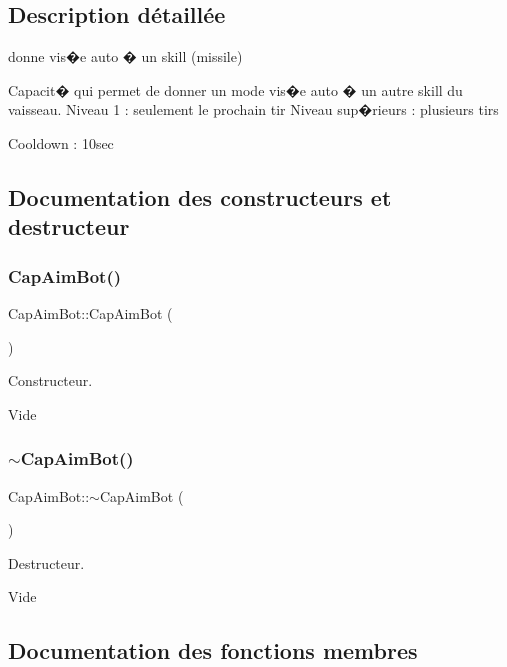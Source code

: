\subsection{Description détaillée}
donne vis�e auto � un skill (missile) 

Capacit� qui permet de donner un mode vis�e auto � un autre skill du vaisseau. Niveau 1 \+: seulement le prochain tir Niveau sup�rieurs \+: plusieurs tirs

Cooldown \+: 10sec 

\subsection{Documentation des constructeurs et destructeur}
\mbox{\label{class_cap_aim_bot_ac80621e5512e382cde343c483f74c90e}} 
\subsubsection{\texorpdfstring{Cap\+Aim\+Bot()}{CapAimBot()}}
{\footnotesize\ttfamily Cap\+Aim\+Bot\+::\+Cap\+Aim\+Bot (\begin{DoxyParamCaption}{ }\end{DoxyParamCaption})}



Constructeur. 

Vide \mbox{\label{class_cap_aim_bot_ac7deb20ca65868d6c752f137cbaea339}} 
\subsubsection{\texorpdfstring{$\sim$\+Cap\+Aim\+Bot()}{~CapAimBot()}}
{\footnotesize\ttfamily Cap\+Aim\+Bot\+::$\sim$\+Cap\+Aim\+Bot (\begin{DoxyParamCaption}{ }\end{DoxyParamCaption})\hspace{0.3cm}{\ttfamily [inline]}}



Destructeur. 

Vide 

\subsection{Documentation des fonctions membres}
\mbox{\label{class_cap_aim_bot_aaa7c76ca67faf851d511c7c46ccc8139}} 
